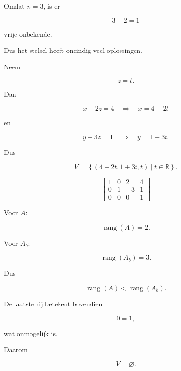 \documentclass{ximera}
\begin{document}
\begin{oefening}{\oefB\ESS}
\begin{question}
\begin{oplossing}
Omdat \(n=3\), is er

\[
3-2=1
\]

vrije onbekende.

Dus het stelsel heeft oneindig veel oplossingen.

Neem

\[
z=t.
\]

Dan

\[
x+2z=4
\quad\Longrightarrow\quad
x=4-2t
\]

en

\[
y-3z=1
\quad\Longrightarrow\quad
y=1+3t.
\]

Dus

\[
V=
\left\{
(4-2t,1+3t,t)
\mid t\in\mathbb{R}
\right\}.
\]

\end{oplossing}

\end{question}


\begin{question}

\[
\left[
\begin{array}{ccc|c}
1&0&2&4\\
0&1&-3&1\\
0&0&0&1
\end{array}
\right]
\]

\begin{oplossing}

Voor \(A\):

\[
\operatorname{rang}(A)=2.
\]

Voor \(A_b\):

\[
\operatorname{rang}(A_b)=3.
\]

Dus

\[
\operatorname{rang}(A)<\operatorname{rang}(A_b).
\]

De laatste rij betekent bovendien

\[
0=1,
\]

wat onmogelijk is.

Daarom

\[
V=\varnothing.
\]

\end{oplossing}

\end{question}

\end{oefening}



\end{document}

